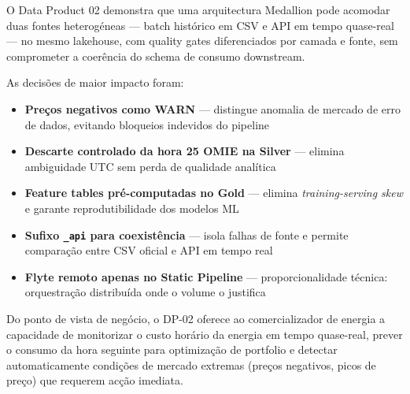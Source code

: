 \documentclass[11pt,a4paper]{article}
\begin{document}
O Data Product 02 demonstra que uma arquitectura Medallion pode acomodar duas fontes heterogéneas --- batch histórico em CSV e API em tempo quase-real --- no mesmo lakehouse, com quality gates diferenciados por camada e fonte, sem comprometer a coerência do schema de consumo downstream.

As decisões de maior impacto foram:

\begin{itemize}[leftmargin=*,noitemsep]
  \item \textbf{Preços negativos como WARN} — distingue anomalia de mercado de erro de dados, evitando bloqueios indevidos do pipeline
  \item \textbf{Descarte controlado da hora 25 OMIE na Silver} — elimina ambiguidade UTC sem perda de qualidade analítica
  \item \textbf{Feature tables pré-computadas no Gold} — elimina \textit{training-serving skew} e garante reprodutibilidade dos modelos ML
  \item \textbf{Sufixo \texttt{\_api} para coexistência} — isola falhas de fonte e permite comparação entre CSV oficial e API em tempo real
  \item \textbf{Flyte remoto apenas no Static Pipeline} — proporcionalidade técnica: orquestração distribuída onde o volume o justifica
\end{itemize}

Do ponto de vista de negócio, o DP-02 oferece ao comercializador de energia a capacidade de monitorizar o custo horário da energia em tempo quase-real, prever o consumo da hora seguinte para optimização de portfolio e detectar automaticamente condições de mercado extremas (preços negativos, picos de preço) que requerem acção imediata.

\end{document}
